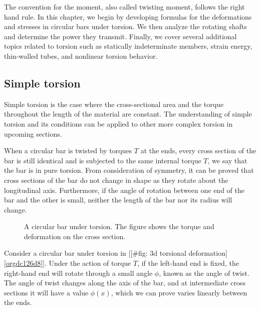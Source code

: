 \documentclass[a4paper,openany,12pt]{book}
\begin{document}
The convention for the moment, also called twisting moment, follows the
right hand rule. In this chapter, we begin by developing formulas for
the deformations and stresses in circular bars under torsion. We then
analyze the rotating shafts and determine the power they transmit.
Finally, we cover several additional topics related to torsion such as
statically indeterminate members, strain energy, thin-walled tubes, and
nonlinear torsion behavior.

\subsection{Simple torsion}
\label{sec:orgaae4b29}
Simple torsion is the case where the cross-sectional area and the torque
throughout the length of the material are constant. The understanding of
simple torsion and its conditions can be applied to other more complex
torsion in upcoming sections.

When a circular bar is twisted by torques \(T\) at the ends, every cross
section of the bar is still identical and is subjected to the same
internal torque \(T\), we say that the bar is in pure torsion. From
consideration of symmetry, it can be proved that cross sections of the
bar do not change in shape as they rotate about the longitudinal axis.
Furthermore, if the angle of rotation between one end of the bar and the
other is small, neither the length of the bar nor its radius will
change.

\begin{figure}[h]
  \centering
  \caption{A circular bar under torsion. The figure shows the torque and deformation on the cross section.}
  \label{fig: 3d torsional deformation}
\end{figure}

Consider a circular bar under torsion in
[[\#fig: 3d torsional deformation]\ref{orgdc126d8}].
Under the action of torque \(T\), if the left-hand end is fixed, the
right-hand end will rotate through a small angle \(\phi\), known as the
angle of twist. The angle of twist changes along the axis of the bar,
and at intermediate cross sections it will have a value \(\phi(x)\), which
we can prove varies linearly between the ends.
\end{document}
